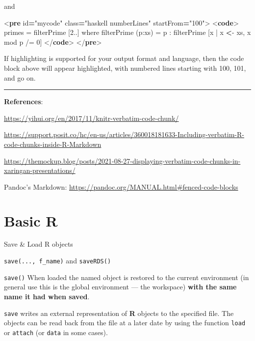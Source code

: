\documentclass[
]{book}
\newenvironment{Shaded}{\begin{snugshade}}{\end{snugshade}}
\newcommand{\DataTypeTok}[1]{\textcolor[rgb]{0.13,0.29,0.53}{#1}}
\newcommand{\ErrorTok}[1]{\textcolor[rgb]{0.64,0.00,0.00}{\textbf{#1}}}
\newcommand{\KeywordTok}[1]{\textcolor[rgb]{0.13,0.29,0.53}{\textbf{#1}}}
\newcommand{\NormalTok}[1]{#1}
\newcommand{\OperatorTok}[1]{\textcolor[rgb]{0.81,0.36,0.00}{\textbf{#1}}}
\newcommand{\OtherTok}[1]{\textcolor[rgb]{0.56,0.35,0.01}{#1}}
\newcommand{\StringTok}[1]{\textcolor[rgb]{0.31,0.60,0.02}{#1}}
\begin{document}
and

\begin{Shaded}
\begin{Highlighting}[]
\DataTypeTok{\textless{}}\KeywordTok{pre}\OtherTok{ id}\OperatorTok{=}\StringTok{"mycode"}\OtherTok{ class}\OperatorTok{=}\StringTok{"haskell numberLines"}\OtherTok{ startFrom}\OperatorTok{=}\StringTok{"100"}\DataTypeTok{\textgreater{}}
  \DataTypeTok{\textless{}}\KeywordTok{code}\DataTypeTok{\textgreater{}}
\NormalTok{  primes = filterPrime [2..] where}
\NormalTok{  filterPrime (p:xs) =}
\NormalTok{    p : filterPrime [x | x }\ErrorTok{\textless{}}\NormalTok{{-} xs, x \textasciigrave{}mod\textasciigrave{} p /= 0]}
  \DataTypeTok{\textless{}/}\KeywordTok{code}\DataTypeTok{\textgreater{}}
\DataTypeTok{\textless{}/}\KeywordTok{pre}\DataTypeTok{\textgreater{}}  
\end{Highlighting}
\end{Shaded}

If highlighting is supported for your output format and language, then the code block above will appear highlighted, with numbered lines starting with 100, 101, and go on.

\begin{center}\rule{0.5\linewidth}{0.5pt}\end{center}

\textbf{References}:

\url{https://yihui.org/en/2017/11/knitr-verbatim-code-chunk/}

\url{https://support.posit.co/hc/en-us/articles/360018181633-Including-verbatim-R-code-chunks-inside-R-Markdown}

\url{https://themockup.blog/posts/2021-08-27-displaying-verbatim-code-chunks-in-xaringan-presentations/}

Pandoc's Markdown: \url{https://pandoc.org/MANUAL.html\#fenced-code-blocks}

\chapter{Basic R}\label{basic-r}

Save \& Load R objects

\texttt{save(...,\ f\_name)} and \texttt{saveRDS()}

\texttt{save()} When loaded the named object is restored to the current environment (in general use this is the global environment --- the workspace) \textbf{with the same name it had when saved}.

\texttt{save} writes an external representation of \textbf{R} objects to the specified file. The objects can be read back from the file at a later date by using the function \texttt{load} or \texttt{attach} (or \texttt{data} in some cases).
\end{document}
